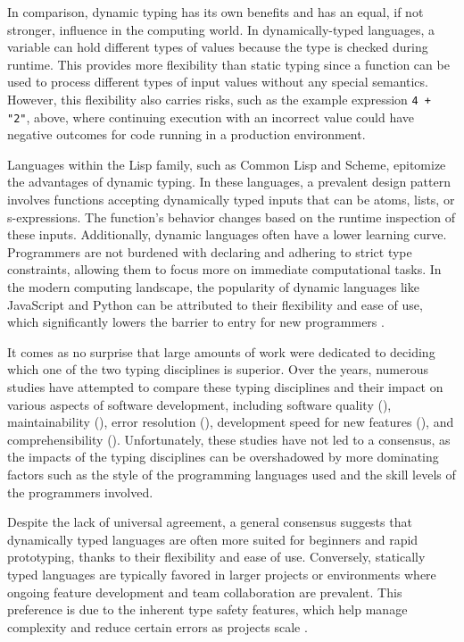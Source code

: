 In comparison, dynamic typing has its own benefits and has an equal, if not stronger, influence in the computing world. In dynamically-typed languages, a variable can hold different types of values because the type is checked during runtime. This provides more flexibility than static typing since a function can be used to process different types of input values without any special semantics. However, this flexibility also carries risks, such as the example expression \texttt{4 + "2"}, above, where continuing execution with an incorrect value could have negative outcomes for code running in a production environment.

Languages within the Lisp family, such as Common Lisp and Scheme, epitomize the advantages of dynamic typing. In these languages, a prevalent design pattern involves functions accepting dynamically typed inputs that can be atoms, lists, or s-expressions. The function's behavior changes based on the runtime inspection of these inputs. Additionally, dynamic languages often have a lower learning curve. Programmers are not burdened with declaring and adhering to strict type constraints, allowing them to focus more on immediate computational tasks. In the modern computing landscape, the popularity of dynamic languages like JavaScript and Python can be attributed to their flexibility and ease of use, which significantly lowers the barrier to entry for new programmers \cite{Chatley2019-uq}.


It comes as no surprise that large amounts of work were dedicated to deciding which one of the two typing disciplines is superior. Over the years, numerous studies have attempted to compare these typing disciplines and their impact on various aspects of software development, including software quality (\cite{Ray2017-gq, Gao2017-xn}), maintainability (\cite{Kleinschmager2012-bg}), error resolution (\cite{Prechelt1998-pd}), development speed for new features (\cite{Prechelt2000-bf, Mayer2012-qc}), and comprehensibility (\cite{Endrikat2014-uz}). Unfortunately, these studies have not led to a consensus, as the impacts of the typing disciplines can be overshadowed by more dominating factors such as the style of the programming languages used and the skill levels of the programmers involved.

Despite the lack of universal agreement, a general consensus suggests that dynamically typed languages are often more suited for beginners and rapid prototyping, thanks to their flexibility and ease of use. Conversely, statically typed languages are typically favored in larger projects or environments where ongoing feature development and team collaboration are prevalent. This preference is due to the inherent type safety features, which help manage complexity and reduce certain errors as projects scale \cite{Chatley2019-uq}.


